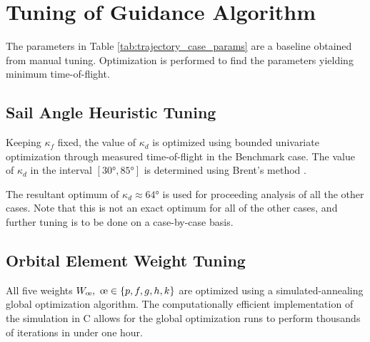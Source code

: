 \section{Tuning of Guidance Algorithm}
The parameters in Table \ref{tab:trajectory_case_params} are a baseline obtained from manual tuning. Optimization is performed to find the parameters yielding minimum time-of-flight.

\subsection{Sail Angle Heuristic Tuning}
Keeping $\kappa_f$ fixed, the value of $\kappa_d$ is optimized using bounded univariate optimization through measured time-of-flight in the  Benchmark case. The value of $\kappa_d$ in the interval $[\ang{30}, \ang{85}]$ is determined using Brent's method \cite{brent2013algorithms}.

The resultant optimum of $\kappa_d \approx \ang{64}$ is used for proceeding analysis of all the other cases. Note that this is not an exact optimum for all of the other cases, and further tuning is to be done on a case-by-case basis.

\subsection{Orbital Element Weight Tuning}
All five weights $W_{\moe}, \ \moe \in \{p, f, g, h, k\}$ are optimized using a simulated-annealing global optimization algorithm. The computationally efficient implementation of the simulation in C allows for the global optimization runs to perform thousands of iterations in under one hour.
